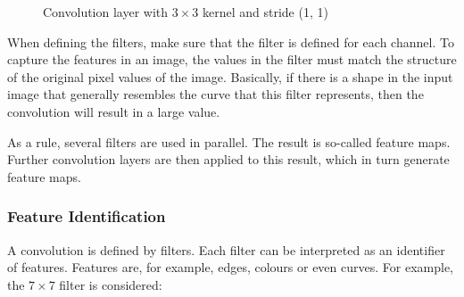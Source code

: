 {\begin{figure}[htb]
        \caption{Convolution layer with $3 \times 3$ kernel and stride (1, 1)}
        \label{concept:conv2d}
        
    \end{figure}
    
When defining the filters, make sure that the filter is defined for each channel.
To capture the features in an image, the values in the filter must match the structure of the original pixel values of the image. Basically, if there is a shape in the input image that generally resembles the curve that this filter represents, then the convolution will result in a large value.

As a rule, several filters are used in parallel. The result is so-called feature maps. Further convolution layers are then applied to this result, which in turn generate feature maps. 


\subsubsection{Feature Identification}

A convolution is defined by filters. Each filter can be interpreted as an identifier of features. Features are, for example, edges, colours or even curves. For example, the $7\times 7$ filter is considered:

}
